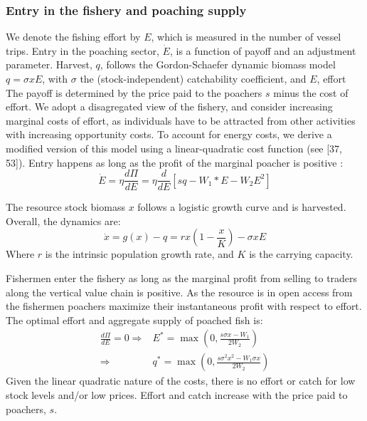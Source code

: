 \subsubsection{Entry in the fishery and poaching supply}
We denote the fishing effort by $E$, which is measured in the number of vessel trips. Entry in the poaching sector, $\dot{E}$, is a function of payoff and an adjustment parameter.  Harvest, $q$, follows the Gordon-Schaefer  dynamic biomass model  $q = \sigma x E$, with $\sigma$ the (stock-independent) catchability coefficient, and $E$, effort
The payoff is determined by the price paid to the poachers $s$ minus the cost of effort. We adopt a disagregated view of the fishery, and consider increasing marginal costs of effort, as individuals have to be attracted from other activities with increasing opportunity costs. To account for energy costs, we derive a modified version of this model using a linear-quadratic cost function (see [37, 53]). Entry happens as long as the profit of the marginal poacher is positive : 
\begin{equation}
    \dot{E}= \eta \frac{d\Pi}{dE} = \eta \frac{d}{dE}\left[ sq-W_1 * E - W_2E^2\right]
\end{equation}

The resource stock biomass $x$ follows a logistic growth curve and is harvested. Overall, the dynamics are: 
\begin{equation}
    \dot{x} = g(x) - q = rx\left(1 - \frac{x}{K}\right) - \sigma x E
    \label{eq:growth}
\end{equation}
Where $r$ is the intrinsic population growth rate,  and $K$ is the carrying capacity. 

Fishermen enter the fishery as long as the marginal profit from selling to traders along the vertical value chain is positive. As the resource is in open access from the fishermen poachers maximize their instantaneous profit with respect to effort. The optimal effort and aggregate supply of poached fish is:
\begin{align}
    \frac{d \Pi}{d E} = 0
    \Rightarrow & E^* = \max\left( 0, \frac{s \sigma x  -W_1}{2W_2} \right)\\
    \Rightarrow & q^* = \max\left(0, \frac{s\sigma^2 x^2 - W_1\sigma x}{2 W_2}\right)
    \label{eq:poachers_supply}
\end{align}
Given the linear quadratic nature of the costs, there is no effort or catch for low stock levels and/or low prices. Effort and catch increase with the price paid to poachers, $s$.


